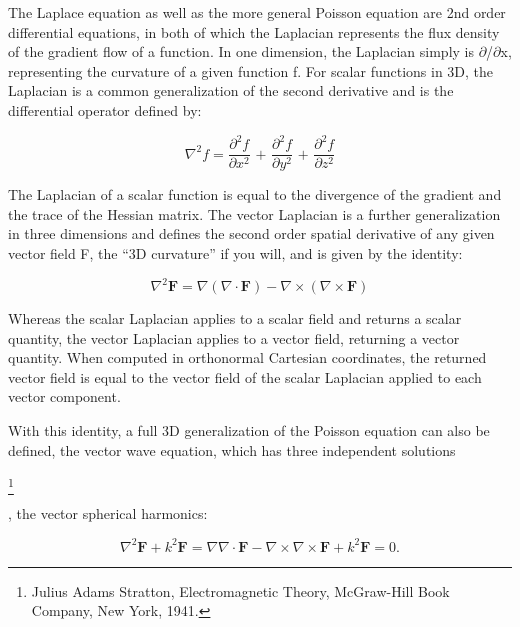 \documentclass[twoside,final]{article}
\begin{document}
{The Laplace equation as well as the more general Poisson equation are 2nd order
differential equations, in both of which the Laplacian represents the flux
density of the gradient flow of a function. In one dimension, the Laplacian
simply is ${\partial}${\texttwosuperior}/${\partial}$x{\texttwosuperior},
representing the curvature of a given function f. For scalar functions in 3D,
the Laplacian is a common generalization of the second derivative and is the
differential operator defined by:

\begin{equation}
\nabla ^2f=\frac{\partial ^2f}{\partial x^2}\text{ + }\frac{\partial ^2f}{\partial y^2}\text{ + }\frac{\partial
^2f}{\partial z^2}
\end{equation}

The Laplacian of a scalar function is equal to the divergence of the gradient
and the trace of the Hessian matrix. The vector Laplacian is a further
generalization in three dimensions and defines the second order spatial
derivative of any given vector field F, the ``3D curvature'' if you will, and is
given by the identity:

\begin{equation}
\nabla ^2 \boldsymbol{F}=\nabla (\nabla \cdot \boldsymbol{F})-\nabla \times (\nabla \times \boldsymbol{F})
\end{equation}


Whereas the scalar Laplacian applies to a scalar field and returns a scalar
quantity, the vector Laplacian applies to a vector field, returning a vector
quantity. When computed in orthonormal Cartesian coordinates, the returned
vector field is equal to the vector field of the scalar Laplacian applied to
each vector component. 

With this identity, a full 3D generalization of the Poisson equation can also be
defined, the vector wave equation, which has three independent
solutions

\footnote{ Julius Adams Stratton, Electromagnetic Theory, McGraw-Hill Book
Company, New York, 1941.\par  }

, the vector spherical harmonics:

\begin{equation}\label{seq:refText3}
{\nabla}^2 \boldsymbol{F}  + k^2 \boldsymbol{F}
 = \nabla \nabla \cdot \boldsymbol{F}  
 - \nabla \times \nabla \times \boldsymbol{F}
 + k^2 \boldsymbol{F} =0.
\end{equation}

}
\end{document}
